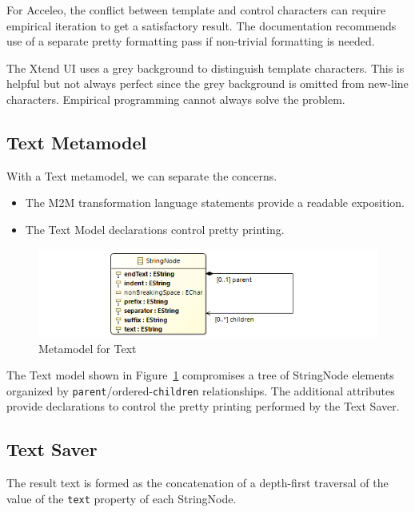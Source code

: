 \documentclass{llncs}
\begin{document}
For Acceleo, the conflict between template and control characters can require empirical iteration to get a satisfactory result. The documentation recommends use of a separate pretty formatting pass if non-trivial formatting is needed.

The Xtend UI uses a grey background to distinguish template characters. This is helpful but not always perfect since the grey background is omitted from new-line characters. Empirical programming cannot always solve the problem.

\subsection{Text Metamodel}\label{Text Metamodel}

With a Text metamodel, we can separate the concerns. 

\begin{itemize}
	\item The M2M transformation language statements provide a readable exposition.
	\item The Text Model declarations control pretty printing.
\end{itemize}

\begin{figure}
	\begin{center}
		\includegraphics[width=4.9in]{TextModel.png}
	\end{center}
	\caption{Metamodel for Text}
	\label{fig:TextModel}
\end{figure}

The Text model shown in Figure~\ref{fig:TextModel} compromises a tree of StringNode elements organized by \verb$parent$/ordered-\verb$children$ relationships. The additional attributes provide declarations to control the pretty printing performed by the Text Saver.

\subsection{Text Saver}\label{Text Saver}

The result text is formed as the concatenation of a depth-first traversal of the value of the \verb$text$ property of each StringNode.
\end{document}
